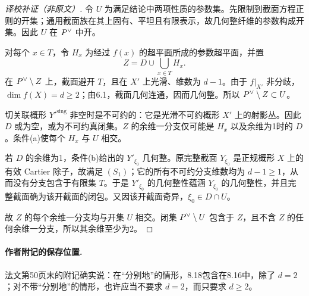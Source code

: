\begin{proof}[译校补证（非原文）]
令 $U$ 为满足结论中两项性质的参数集。先限制到截面方程正则的开集；通用截面族在其上固有、平坦且有限表示，故几何整纤维的参数构成开集。因此 $U$ 在 $P^\vee$ 中开。

对每个 $x\in T$，令 $H_x$ 为经过 $f(x)$ 的超平面所成的参数超平面，并置
\[
 Z=D\cup\bigcup_{x\in T}H_x.
\]
在 $P^\vee\setminus Z$ 上，截面避开 $T$，且在 $X'$ 上光滑、维数为 $d-1$。由于 $f|_{X'}$ 非分歧，$\dim f(X)=d\ge2$；由6.1，截面几何连通，因而几何整。所以 $P^\vee\setminus Z\subset U$。

切关联概形 $Y'^{\mathrm{sing}}$ 非空时是不可约的：它是光滑不可约概形 $X'$ 上的射影丛。因此 $D$ 或为空，或为不可约真闭集。$Z$ 的余维一分支仅可能是 $H_x$ 以及余维为1时的 $D$。条件(a)使每个 $H_x$ 与 $U$ 相交。

若 $D$ 的余维为1，条件(b)给出的 $Y'_{\xi_0}$ 几何整。原完整截面 $Y_{\xi_0}$ 是正规概形 $X$ 上的有效 Cartier 除子，故满足 $(S_1)$；它的所有不可约分支维数均为 $d-1\ge1$，从而没有分支包含于有限集 $T$。于是 $Y'_{\xi_0}$ 的几何整性蕴涵 $Y_{\xi_0}$ 的几何整性，并且完整截面确为该开截面的闭包。又因该开截面奇异，$\xi_0\in D\cap U$。

故 $Z$ 的每个余维一分支均与开集 $U$ 相交。闭集 $P^\vee\setminus U$ 包含于 $Z$，且不含 $Z$ 的任何余维一分支，所以其余维至少为2。
\end{proof}

\paragraph{作者附记的保存位置.}
法文第50页末的附记确实说：在“分别地”的情形，8.18包含在8.16中，除了 $d=2$；对不带“分别地”的情形，也许应当不要求 $d=2$，而只要求 $d\ge2$。
\par
\endgroup
